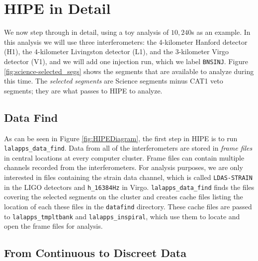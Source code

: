 \section{HIPE in Detail}
\label{sec:HIPEdetail}

We now step through \ihope in detail, using a toy analysis of $10,240$s as an example. In this analysis we will use three interferometers: the 4-kilometer Hanford detector (H1), the 4-kilometer Livingston detector (L1), and the 3-kilometer Virgo detector (V1), and we will add one injection run, which we label \texttt{BNSINJ}. Figure \ref{fig:science-selected_segs} shows the segments that are available to analyze during this time. The \emph{selected segments} are Science segments minus CAT1 veto segments; they are what \ihope passes to \ac{HIPE} to analyze.

\subsection{Data Find}
\label{sec:data_find}

As can be seen in Figure \ref{fig:HIPEDiagram}, the first step in \ac{HIPE} is to run \texttt{lalapps\_data\_find}. Data from all of the interferometers are stored in \emph{frame files} in central locations at every computer cluster. Frame files can contain multiple channels recorded from the interferometers. For analysis purposes, we are only interested in files containing the strain data channel, which is called \texttt{LDAS-STRAIN} in the \ac{LIGO} detectors and \texttt{h\_16384Hz} in Virgo. \texttt{lalapps\_data\_find} finds the files covering the selected segments on the cluster and creates cache files listing the location of each these files in the \texttt{datafind} directory. These cache files are passed to \texttt{lalapps\_tmpltbank} and \texttt{lalapps\_inspiral}, which use them to locate and open the frame files for analysis.

\subsection{From Continuous to Discreet Data}
\label{sec:cont_to_discreet}

